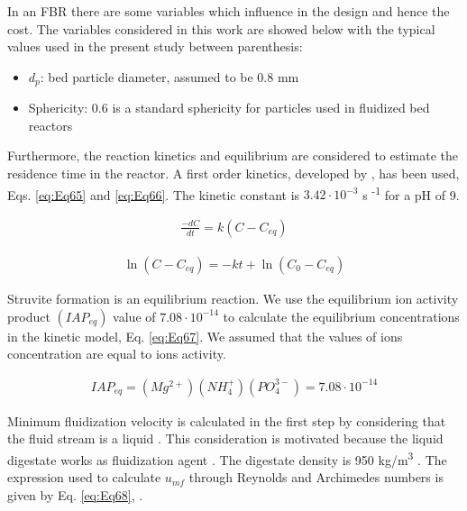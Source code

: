 \begin{refsection}[referencesCh2]
In an FBR there are some variables which influence in the design and hence the cost. The variables considered in this work are showed below with the typical values used in the present study between parenthesis:

\begin{itemize}
	\item $d_p$: bed particle diameter, assumed to be 0.8 mm \citep{jordaan2011development}
	\item Sphericity: 0.6 is a standard sphericity for particles used in fluidized bed reactors \citep{Fogler2005Elements}
\end{itemize}

Furthermore, the reaction kinetics and equilibrium are considered to estimate the residence time in the reactor. A first order kinetics, developed by \citep{nelson2003struvite}, has been used, Eqs. \ref{eq:Eq65} and \ref{eq:Eq66}. The kinetic constant is $3.42 \cdot 10^{-3}$ s \textsuperscript{-1} for a pH of 9.

\begin{align}
	\frac{{-dC}}{{dt}} = k \left({C - {C_{eq}}} \right) \label{eq:Eq65}
\end{align}

\begin{align}
	\ln \left( {C - {C_{eq}}} \right) =  - kt + \ln \left( {{C_0} - {C_{eq}}} \right) \label{eq:Eq66}
\end{align}

Struvite formation is an equilibrium reaction. We use the equilibrium ion activity product $\left(IAP_{eq}\right)$ value of $7.08 \cdot 10^{-14}$ \citep{nelson2003struvite} to calculate the equilibrium concentrations in the kinetic model, Eq. \ref{eq:Eq67}. We assumed that the values of ions concentration are equal to ions activity.

\begin{align}
	IAP_{eq} = \left( {Mg^{2+}} \right)\left( NH_4^{+} \right)\left( {PO_4^{3-}} \right) = 7.08 \cdot {10^{ - 14}}  \label{eq:Eq67}
\end{align}

Minimum fluidization velocity is calculated in the first step by considering that the fluid stream is a liquid \citep{mangin2004fluid}. This consideration is motivated because the liquid digestate works as fluidization agent \citep{le2006understanding}. The digestate density is 950 kg/m\textsuperscript{3} \citep{rigby2011new}. The expression used to calculate $u_{mf}$ through Reynolds and Archimedes numbers is given by Eq. \ref{eq:Eq68}, \citep{tisa2014basic}.


\end{refsection}
